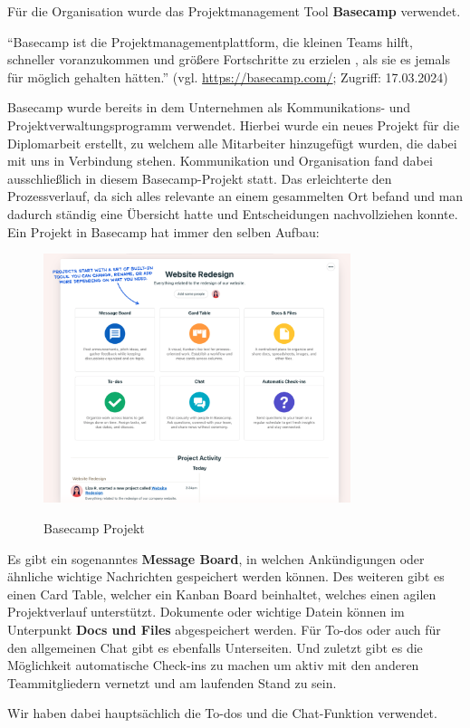 Für die Organisation wurde das Projektmanagement Tool \textbf{Basecamp} verwendet.

“Basecamp ist die Projektmanagementplattform, die kleinen Teams hilft, schneller voranzukommen und größere Fortschritte zu erzielen , als sie es jemals für möglich gehalten hätten.”
\newline
(vgl. \url{https://basecamp.com/}; Zugriff: 17.03.2024)

Basecamp wurde bereits in dem Unternehmen als Kommunikations- und Projektverwaltungsprogramm verwendet. Hierbei wurde ein neues Projekt für die Diplomarbeit erstellt, zu welchem alle Mitarbeiter hinzugefügt wurden, die dabei mit uns in Verbindung stehen.
Kommunikation und Organisation fand dabei ausschließlich in diesem Basecamp-Projekt statt. Das erleichterte den Prozessverlauf, da sich alles relevante an einem gesammelten Ort befand und man dadurch ständig eine Übersicht hatte und Entscheidungen nachvollziehen konnte.
Ein Projekt in Basecamp hat immer den selben Aufbau:

\begin{figure}[h!]
    \centering
    \includegraphics[width=0.8\textwidth]{pics/basecamp-project-overview.png}
    \caption{Basecamp Projekt}
    \cite{basecamp_project}
    \label{fig:mesh1}
\end{figure}

Es gibt ein sogenanntes \textbf{Message Board}, in welchen Ankündigungen oder ähnliche wichtige Nachrichten gespeichert werden können. Des weiteren gibt es einen Card Table, welcher ein Kanban Board beinhaltet, welches einen agilen Projektverlauf unterstützt. Dokumente oder wichtige Datein können im Unterpunkt \textbf{Docs und Files} abgespeichert werden. Für To-dos oder auch für den allgemeinen Chat gibt es ebenfalls Unterseiten. Und zuletzt gibt es die Möglichkeit automatische Check-ins zu machen um aktiv mit den anderen Teammitgliedern vernetzt und am laufenden Stand zu sein.

Wir haben dabei hauptsächlich die To-dos und die Chat-Funktion verwendet.